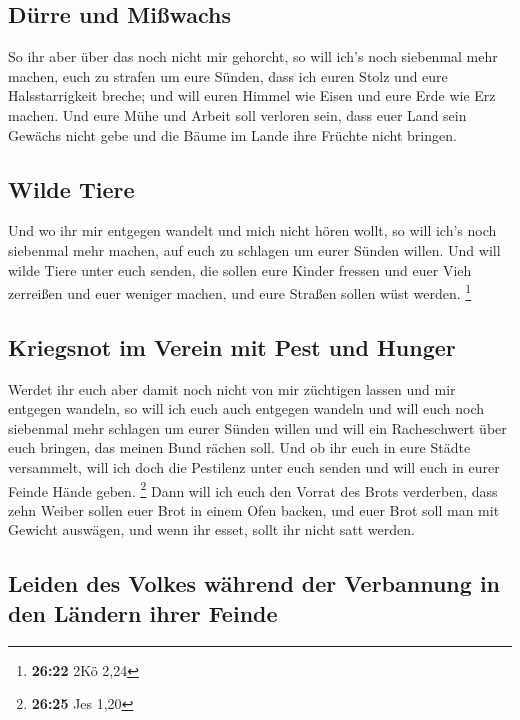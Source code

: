 \hypertarget{duxfcrre-und-miuxdfwachs}{%
\subsection{Dürre und Mißwachs}\label{duxfcrre-und-miuxdfwachs}}

 So ihr aber über das noch nicht mir gehorcht, so will
ich's noch siebenmal mehr machen, euch zu strafen um eure Sünden,
 dass ich euren Stolz und eure Halsstarrigkeit breche;
und will euren Himmel wie Eisen und eure Erde wie Erz machen.
 Und eure Mühe und Arbeit soll verloren sein, dass euer
Land sein Gewächs nicht gebe und die Bäume im Lande ihre Früchte nicht
bringen.

\hypertarget{wilde-tiere}{%
\subsection{Wilde Tiere}\label{wilde-tiere}}

 Und wo ihr mir entgegen wandelt und mich nicht hören
wollt, so will ich's noch siebenmal mehr machen, auf euch zu schlagen um
eurer Sünden willen.  Und will wilde Tiere unter euch
senden, die sollen eure Kinder fressen und euer Vieh zerreißen und euer
weniger machen, und eure Straßen sollen wüst werden. \footnote{\textbf{26:22}
  2Kö 2,24}

\hypertarget{kriegsnot-im-verein-mit-pest-und-hunger}{%
\subsection{Kriegsnot im Verein mit Pest und
Hunger}\label{kriegsnot-im-verein-mit-pest-und-hunger}}

 Werdet ihr euch aber damit noch nicht von mir züchtigen
lassen und mir entgegen wandeln,  so will ich euch auch
entgegen wandeln und will euch noch siebenmal mehr schlagen um eurer
Sünden willen  und will ein Racheschwert über euch
bringen, das meinen Bund rächen soll. Und ob ihr euch in eure Städte
versammelt, will ich doch die Pestilenz unter euch senden und will euch
in eurer Feinde Hände geben. \footnote{\textbf{26:25} Jes 1,20}
 Dann will ich euch den Vorrat des Brots verderben, dass
zehn Weiber sollen euer Brot in einem Ofen backen, und euer Brot soll
man mit Gewicht auswägen, und wenn ihr esset, sollt ihr nicht satt
werden.

\hypertarget{leiden-des-volkes-wuxe4hrend-der-verbannung-in-den-luxe4ndern-ihrer-feinde}{%
\subsection{Leiden des Volkes während der Verbannung in den Ländern
ihrer
Feinde}\label{leiden-des-volkes-wuxe4hrend-der-verbannung-in-den-luxe4ndern-ihrer-feinde}}

